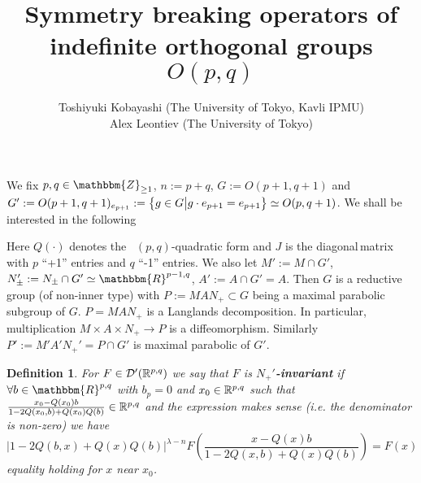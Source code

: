 \documentclass[10pt]{article} %
\newcommand{\assign}{:=}
\newtheorem{definition}{Definition}
\newcommand{\tmtextbf}[1]{{\bfseries{#1}}}
\begin{document}
\title{Symmetry breaking operators of indefinite orthogonal groups $O(p,q)$}

  \author{Toshiyuki Kobayashi (The University of Tokyo, Kavli IPMU)\\
  Alex Leontiev (The University of Tokyo)}




  \maketitle

We fix $p, q \in \mathbbm{Z}_{\geq 1}$, $n \assign p + q$, $G \assign O (p +
1, q + 1)$ and $G' \assign O (p + 1, q + 1)_{e_{p + 1}} \assign \mysetn{g \in
G}{g \cdot e_{p + 1} = e_{p + 1}} \simeq O (p, q + 1)$. We shall be interested
in the following

Here $Q (\cdot)$ denotes the \ $(p, q)$-quadratic form and $J$ is the
diagonal\,matrix with $p$ ``+1'' entries and $q$ ``-1'' entries. We also let
$M' \assign M \cap G'$, $N_{\pm}' \assign N_{\pm} \cap G' \simeq
\mathbbm{R}^{p - 1, q}$, $A' \assign A \cap G' = A$. Then $G$ is a reductive
group (of non-inner type) with $P \assign M A N_+ \subset G$ being a maximal
parabolic subgroup of $G$. $P = M A N_+$ is a Langlands decomposition. In
particular, multiplication $M \times A \times N_+ \rightarrow P$ is a
diffeomorphism. Similarly $P' \assign M' A' N_+' = P \cap G'$ is maximal
parabolic of $G'$.

\begin{definition}
	\label{def-n-nots:def-n+invar}For $F \in \mathcal{D}' (\mathbb{R}^{p,q})$
  we say that $F$ is
  \tmtextbf{$N_+'$-invariant} if $\forall b \in \mathbbm{R}^{p, q}$
  with $b_p = 0$ and $x_0 \in \mathbb{R}^{p,q}$ such that $\frac{x_0 - Q (x_0) b}{1 - 2 Q
  (x_0, b) + Q (x_0) Q (b)} \in \mathbb{R}^{p,q}$ and the expression makes sense (i.e. the
  denominator is non-zero) we have
  \begin{equation*}
    \label{eq-Nequiv} | 1 - 2 Q (b, x) + Q (x) Q (b) |^{\lambda - n} F \left(
    \frac{x - Q (x) b}{1 - 2 Q (x, b) + Q (x) Q (b)} \right) = F (x)
  \end{equation*}
  equality holding for $x$ near $x_0$.
\end{definition}
\end{document}

